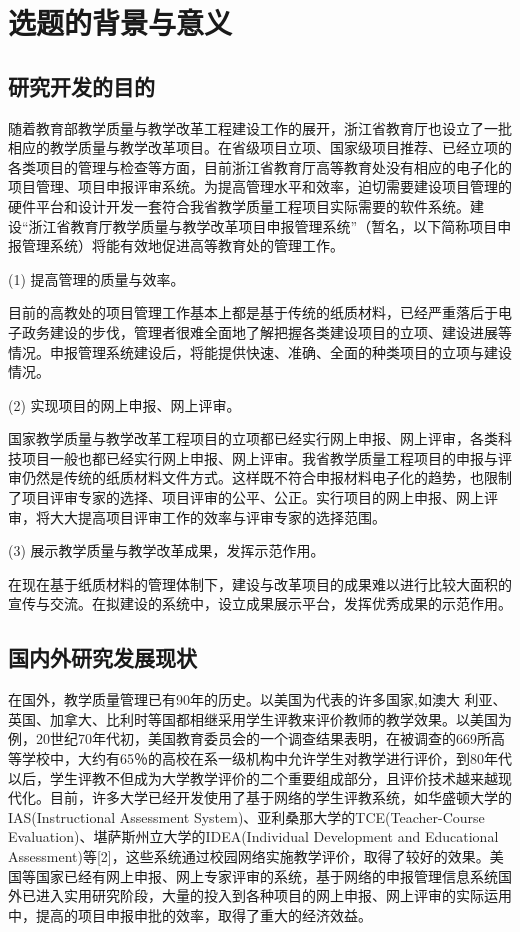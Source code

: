 
\chapter{选题的背景与意义}
\section{研究开发的目的}
随着教育部教学质量与教学改革工程建设工作的展开，浙江省教育厅也设立了一批相应的教学质量与教学改革项目。在省级项目立项、国家级项目推荐、已经立项的各类项目的管理与检查等方面，目前浙江省教育厅高等教育处没有相应的电子化的项目管理、项目申报评审系统。为提高管理水平和效率，迫切需要建设项目管理的硬件平台和设计开发一套符合我省教学质量工程项目实际需要的软件系统。建设“浙江省教育厅教学质量与教学改革项目申报管理系统”（暂名，以下简称项目申报管理系统）将能有效地促进高等教育处的管理工作。

(1) 提高管理的质量与效率。\par
目前的高教处的项目管理工作基本上都是基于传统的纸质材料，已经严重落后于电子政务建设的步伐，管理者很难全面地了解把握各类建设项目的立项、建设进展等情况。申报管理系统建设后，将能提供快速、准确、全面的种类项目的立项与建设情况。

(2) 实现项目的网上申报、网上评审。\par
国家教学质量与教学改革工程项目的立项都已经实行网上申报、网上评审，各类科技项目一般也都已经实行网上申报、网上评审。我省教学质量工程项目的申报与评审仍然是传统的纸质材料文件方式。这样既不符合申报材料电子化的趋势，也限制了项目评审专家的选择、项目评审的公平、公正。实行项目的网上申报、网上评审，将大大提高项目评审工作的效率与评审专家的选择范围。

(3) 展示教学质量与教学改革成果，发挥示范作用。\par
在现在基于纸质材料的管理体制下，建设与改革项目的成果难以进行比较大面积的宣传与交流。在拟建设的系统中，设立成果展示平台，发挥优秀成果的示范作用。

\section{国内外研究发展现状}
在国外，教学质量管理已有90年的历史。以美国为代表的许多国家,如澳大 利亚、英国、加拿大、比利时等国都相继采用学生评教来评价教师的教学效果。以美国为例，20世纪70年代初，美国教育委员会的一个调查结果表明，在被调查的669所高等学校中，大约有65％的高校在系一级机构中允许学生对教学进行评价，到80年代以后，学生评教不但成为大学教学评价的二个重要组成部分，且评价技术越来越现代化。目前，许多大学已经开发使用了基于网络的学生评教系统，如华盛顿大学的IAS(Instructional Assessment System)、亚利桑那大学的TCE(Teacher-Course Evaluation)、堪萨斯州立大学的IDEA(Individual Development and Educational Assessment)等[2]，这些系统通过校园网络实施教学评价，取得了较好的效果。美国等国家已经有网上申报、网上专家评审的系统，基于网络的申报管理信息系统国外已进入实用研究阶段，大量的投入到各种项目的网上申报、网上评审的实际运用中，提高的项目申报申批的效率，取得了重大的经济效益。

